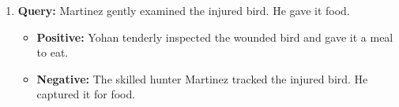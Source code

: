 \begin{enumerate}
    \item \textbf{Query:}  Martinez gently examined the injured bird. He gave it food.
        \begin{itemize}
            \item \textbf{Positive:} Yohan tenderly inspected the wounded bird and gave it a meal to eat.
            \item \textbf{Negative:} The skilled hunter Martinez tracked the injured bird. He captured it for food.
        \end{itemize}



\end{enumerate}








